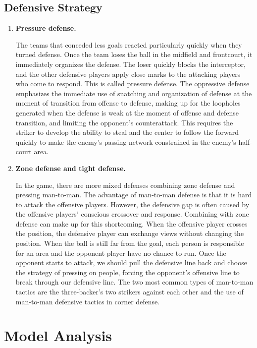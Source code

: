 \documentclass{mcmthesis}
\begin{document}
\begin{enumerate}[(1)]
\end{enumerate}
\subsection{Defensive Strategy}
\begin{enumerate}[(1)]
	\item \textbf{Pressure defense.}\par
	\qquad The teams that conceded less goals reacted particularly quickly when they turned defense. Once the team loses the ball in the midfield and frontcourt, it immediately organizes the defense. The loser quickly blocks the interceptor, and the other defensive players apply close marks to the attacking players who come to respond. This is called pressure defense. The oppressive defense emphasizes the immediate use of snatching and organization of defense at the moment of transition from offense to defense, making up for the loopholes generated when the defense is weak at the moment of offense and defense transition, and limiting the opponent's counterattack. This requires the striker to develop the ability to steal and the center to follow the forward quickly to make the enemy's passing network constrained in the enemy's half-court area.
	\item \textbf{Zone defense and tight defense.}\par
	\qquad In the game, there are more mixed defenses combining zone defense and pressing man-to-man. The advantage of man-to-man defense is that it is hard to attack the offensive players. However, the defensive gap is often caused by the offensive players' conscious crossover and response. Combining with zone defense can make up for this shortcoming. When the offensive player crosses the position, the defensive player can exchange views without changing the position. When the ball is still far from the goal, each person is responsible for an area and the opponent player have no chance to run. Once the opponent starts to attack, we should pull the defensive line back and choose the strategy of pressing on people, forcing the opponent's offensive line to break through our defensive line. The two most common types of man-to-man tactics are the three-backer's two strikers against each other and the use of man-to-man defensive tactics in corner defense.
\end{enumerate}

\section{Model Analysis}
\end{document}
